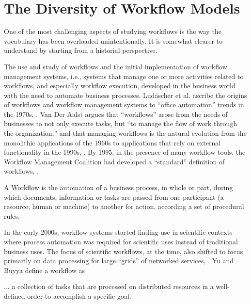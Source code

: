 \section{The Diversity of Workflow Models}\label{workflows}

One of the most challenging aspects of studying workflows is the way the
vocabulary has been overloaded unintentionally.  It is somewhat clearer to
understand by starting from a historial perspective.

The use and study of workflows and the initial implementation of workflow
management systems, i.e., systems that manage one or more activities related to
workflows, and especially workflow execution, developed in the business world
with the need to automate business processes. Lud\"{a}scher et al.  ascribe the
origins of workflows and workflow management systems to ``office automation''
trends in the 1970s, \cite{ludascher_scientific_2006}. Van Der Aalst argues that
``workflows'' arose from the needs of businesses to not only execute tasks, but
``to manage the flow of work through the organization,'' and that managing
workflows is the natural evolution from the monolithic applications of the 1960s
to applications that rely on external functionality in the 1990s,
\cite{van_der_aalst_application_1998}. By 1995, in the presence of many workflow
tools, the Workflow Management Coalition had developed a ``standard'' definition
of workflows, \cite{hollingsworth_workflow_1993},

\begin{displayquote} A Workflow is the automation of a business process, in
whole or part, during which documents, information or tasks are passed from one
participant (a resource; human or machine) to another for action, according a
set of procedural rules.  \end{displayquote}

In the early 2000s, workflow systems started finding use in scientific contexts
where process automation was required for scientific uses instead of traditional
business uses. The focus of scientific workflows, at the time, also shifted to
focus primarily on data processing for large ``grids'' of networked services,
\cite{yu_taxonomy_2005}. Yu and Buyya define a workflow as

\begin{displayquote} ... a collection of tasks that are processed on distributed
resources in a well-defined order to accomplish a specific goal.
\end{displayquote}

